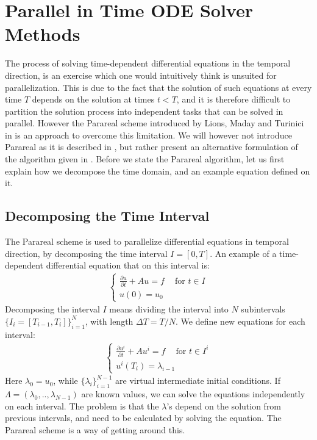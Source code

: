 \chapter{Parallel in Time ODE Solver Methods} \label{parareal_chap}
The process of solving time-dependent differential equations in the temporal direction, is an exercise which one would intuitively think is unsuited for parallelization. This is due to the fact that the solution of such equations at every time $T$ depends on the solution at times $t<T$, and it is therefore difficult to partition the solution process into independent tasks that can be solved in parallel. However the Parareal scheme introduced by Lions, Maday and Turinici in \cite{lions2001resolution}is an approach to overcome this limitation. We will however not introduce Parareal as it is described in \cite{lions2001resolution}, but rather present an alternative formulation of the algorithm given in \cite{baffico2002parallel}. Before we state the Parareal algorithm, let us first explain how we decompose the time domain, and an example equation defined on it.
\section{Decomposing the Time Interval} \label{Para_dcomp_sec}
The Parareal scheme is used to parallelize differential equations in temporal direction, by decomposing the time interval $I=[0,T]$. An example of a time-dependent differential equation that on this interval is:
\begin{align}
\left\{
   	\begin{array}{lr}
		\frac{\partial u}{\partial t} + Au = f \ \quad \textrm{for $t \in I$} \\
		u(0)=u_0
	\end{array}
   \right. \label{unbroken}
\end{align} 
Decomposing the interval $I$ means dividing the interval into $N$ subintervals $\{I_i = [T_{i-1},T_{i}]\}_{i=1}^{N}$, with length $\Delta T = T/N$. We define new equations for each interval:
\begin{align}
\left\{
     \begin{array}{lr}
		\frac{\partial u^i}{\partial t} + Au^i = f \ \quad \textrm{for $t \in I^i$} \\
		u^i(T_i)=\lambda_{i-1}
	\end{array}
	\right.	\label{broken}
\end{align}
Here $\lambda_0=u_0$, while $\{\lambda_i\}_{i=1}^{N-1}$ are virtual intermediate initial conditions. If $\Lambda=(\lambda_0,..,\lambda_{N-1})$ are known values, we can solve the equations independently on each interval. The problem is that the $\lambda$'s depend on the solution from previous intervals, and need to be calculated by solving the equation. The Parareal scheme is a way of getting around this.
